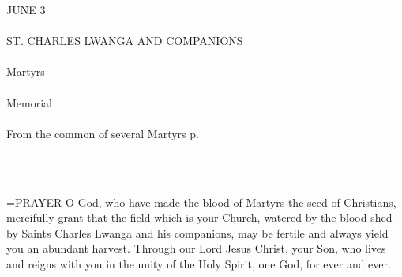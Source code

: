 \begin{center}\normalsize \begin{center}\normalsize JUNE 3\\\\
\footnotesize \footnotesize ST. CHARLES LWANGA AND COMPANIONS\\\\
\footnotesize \footnotesize Martyrs\\\\
\footnotesize \footnotesize Memorial\\\\
\footnotesize \footnotesize From the common of several Martyrs p. \\\\
\footnotesize \end{center}\\
\end{center}

\hangindent=\parindent \small{PRAYER 
O God, who have made the blood of Martyrs
the seed of Christians,
mercifully grant that the field which is your Church,
watered by the blood
shed by Saints Charles Lwanga and his companions,
may be fertile and always yield you an abundant harvest.
Through our Lord Jesus Christ, your Son,
who lives and reigns with you in the unity of the Holy Spirit,
one God, for ever and ever.\\}
 
